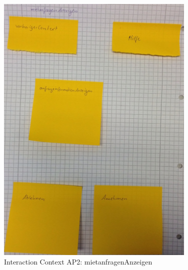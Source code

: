 \begin{figure}[H]
\centering
\includegraphics[angle=90, width=0.85\textwidth]  {./images/abstract/version2/mietanfragenAnzeigen.JPG}
\caption{Interaction Context AP2: mietanfragenAnzeigen}
\label{interfaceContents47}
\end{figure}


